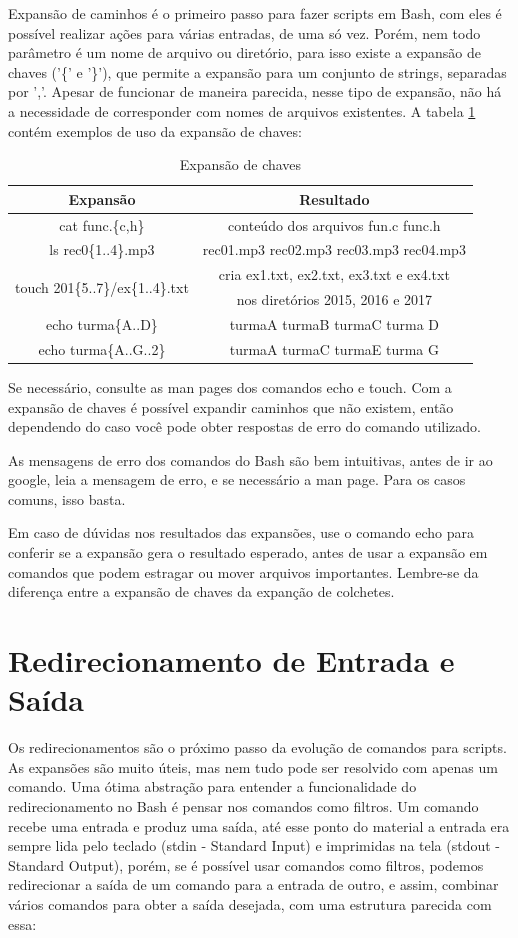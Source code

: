 \documentclass[oneside, 11 pt]{article}
\begin{document}
	
	Expansão de caminhos é o primeiro passo para fazer scripts em Bash, com eles é possível realizar ações para várias entradas, de uma só vez. Porém, nem todo parâmetro é um nome de arquivo ou diretório, para isso existe a expansão de chaves ('\{' e '\}'), que permite a expansão para um conjunto de strings, separadas por ','. Apesar de funcionar de maneira parecida, nesse tipo de expansão, não há a necessidade de corresponder com nomes de arquivos existentes. A tabela \ref{table:3} contém exemplos de uso da expansão de chaves:
	
	\begin{table}[!ht]
		\centering
		\begin{tabular}{ | c | c | } 
			\hline
			\bfseries Expansão & \bfseries Resultado \\
			\hline
			cat func.\{c,h\} & conteúdo dos arquivos fun.c func.h \\
			\hline
			ls rec0\{1..4\}.mp3 & rec01.mp3 rec02.mp3 rec03.mp3 rec04.mp3 \\
			\hline
			\multirow{2}{13em}{touch 201\{5..7\}/ex\{1..4\}.txt} & cria ex1.txt, ex2.txt, ex3.txt e ex4.txt \\ 
			& nos diretórios 2015, 2016 e 2017 \\
			\hline
			echo turma\{A..D\} & turmaA turmaB turmaC turma D\\
			\hline
			echo turma\{A..G..2\} & turmaA turmaC turmaE turma G\\
			\hline
		\end{tabular}
		\caption{Expansão de chaves}
		\label{table:3}
	\end{table}
	Se necessário, consulte as man pages dos comandos echo e touch. Com a expansão de chaves é possível expandir caminhos que não existem, então dependendo do caso você pode obter respostas de erro do comando utilizado.
	
	As mensagens de erro dos comandos do Bash são bem intuitivas, antes de ir ao google, leia a mensagem de erro, e se necessário a man page. Para os casos comuns, isso basta.
	
	Em caso de dúvidas nos resultados das expansões, use o comando echo para conferir se a expansão gera o resultado esperado, antes de usar a expansão em comandos que podem estragar ou mover arquivos importantes. Lembre-se da diferença entre a expansão de chaves da expanção de colchetes.
	\section{Redirecionamento de Entrada e Saída}
	Os redirecionamentos são o próximo passo da evolução de comandos para scripts. As expansões são muito úteis, mas nem tudo pode ser resolvido com apenas um comando. Uma ótima abstração para entender a funcionalidade do redirecionamento no Bash é pensar nos comandos como filtros. Um comando recebe uma entrada e produz uma saída, até esse ponto do material a entrada era sempre lida pelo teclado (stdin - Standard Input) e imprimidas na tela (stdout - Standard Output), porém, se é possível usar comandos como filtros, podemos redirecionar a saída de um comando para a entrada de outro, e assim, combinar vários comandos para obter a saída desejada, com uma estrutura parecida com essa:
	
\end{document}
